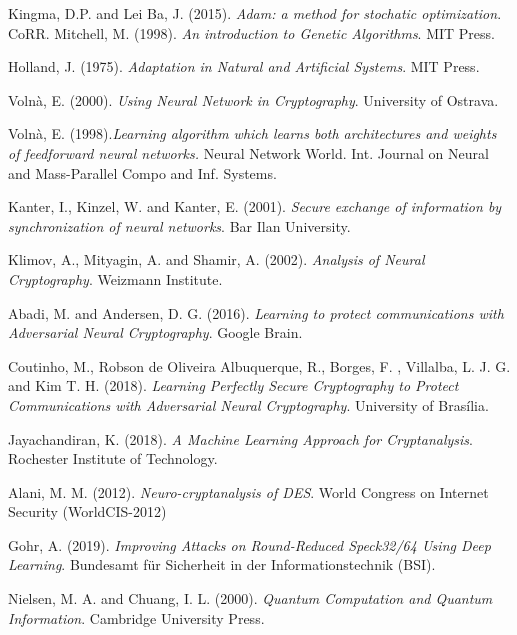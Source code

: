 \documentclass[%
    corpo=11pt,
    twoside,
    stile=classica,
    oldstyle,
    autoretitolo,
    tipotesi=magistrale,
    greek,
    evenboxes,
    english
]{toptesi}
\begin{document}
\begin{thebibliography}{99}
 {\sc Kingma, D.P.} and {\sc Lei Ba, J.} (2015). \textit{Adam: a method for stochatic optimization}. CoRR.
 {\sc Mitchell, M.} (1998). \textit{An introduction to Genetic Algorithms}. MIT Press.

 {\sc Holland, J.} (1975). \textit{Adaptation in Natural and Artificial Systems}. MIT Press. 

 {\sc Volnà, E.} (2000). \textit{Using Neural Network in Cryptography}. University of Ostrava.

 {\sc Volnà, E.} (1998).\textit{Learning algorithm which learns both architectures and weights of feedforward neural networks.} Neural Network World. Int. Journal on Neural and Mass-Parallel Compo and Inf. Systems.

 {\sc Kanter, I.}, {\sc Kinzel, W.} and {\sc Kanter, E.} (2001). \textit{Secure exchange of information by synchronization of neural networks}. Bar Ilan University.

 {\sc Klimov, A.}, {\sc Mityagin, A.} and {\sc Shamir, A.} (2002). \textit{Analysis of Neural Cryptography}. Weizmann Institute.


 {\sc Abadi, M.} and {\sc Andersen, D. G.} (2016). \textit{Learning to protect communications with Adversarial Neural Cryptography}. Google Brain.

 {\sc Coutinho, M.}, {\sc Robson de Oliveira Albuquerque, R.}, {\sc Borges, F. }, {\sc Villalba, L. J. G.} and  {\sc Kim T. H.} (2018). \textit{Learning Perfectly Secure Cryptography to Protect Communications with Adversarial Neural Cryptography}. University of Brasília.

 {\sc Jayachandiran, K.} (2018). \textit{A Machine Learning Approach for Cryptanalysis}. Rochester Institute of Technology.

 {\sc Alani, M. M.} (2012). \textit{Neuro-cryptanalysis of DES}. World Congress on Internet Security (WorldCIS-2012)

 {\sc Gohr, A.} (2019). \textit{Improving Attacks on Round-Reduced Speck32/64 Using Deep Learning}. Bundesamt für Sicherheit in der Informationstechnik (BSI).

 {\sc Nielsen, M. A.} and {\sc Chuang, I. L.} (2000). \textit{Quantum Computation and Quantum Information}. Cambridge University Press.


\end{thebibliography}
\end{document}

